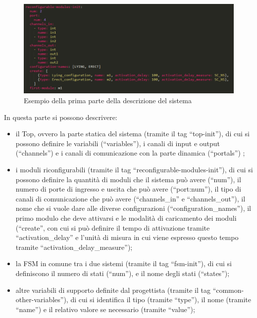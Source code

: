 \documentclass[a4paper,titlepage]{book}
\begin{document}
\begin{figure}[!ht]
\centering
\includegraphics[scale=0.6]{pyngu_init_example.png}
\caption{Esempio della prima parte della descrizione del sistema}\label{fig:10}
\end{figure}

In questa parte si possono descrivere: 
\begin{itemize}

\item il Top, ovvero la parte statica del sistema (tramite il tag ``top-init''), di cui si possono definire le variabili (``variables''), i canali di input e output (``channels'') e i canali di comunicazione con la parte dinamica (``portals'') ;

\item i moduli riconfigurabili (tramite il tag ``reconfigurable-modules-init''), di cui si possono definire la quantità di moduli che il sistema può avere (``num''), il numero di porte di ingresso e uscita che può avere (``port:num''), il tipo di canali di comunicazione che può avere (``channels\_in'' e ``channels\_out''), il nome che si vuole dare alle diverse configurazioni (``configuration\_names''), il primo modulo che deve attivarsi e le modalità di caricamento dei moduli (``create'', con cui si può definire il tempo di attivazione tramite ``activation\_delay'' e l'unità di misura in cui viene espresso questo tempo tramite ``activation\_delay\_measure'');

\item la FSM in comune tra i due sistemi (tramite il tag ``fsm-init''), di cui si definiscono il numero di stati (``num''), e il nome degli stati (``states'');

\item altre variabili di supporto definite dal progettista (tramite il tag ``common-other-variables''), di cui si identifica il tipo (tramite ``type''),  il nome (tramite ``name'') e il relativo valore se necessario (tramite ``value'');

\end{itemize}
\end{document}
